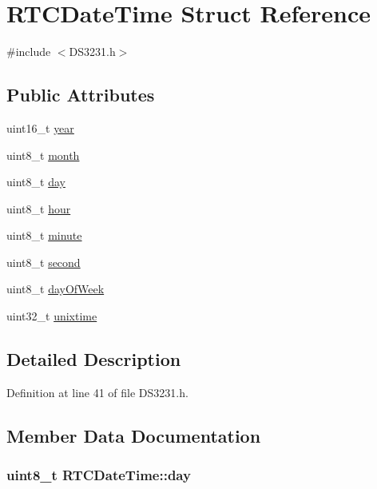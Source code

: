 \hypertarget{struct_r_t_c_date_time}{}\section{R\+T\+C\+Date\+Time Struct Reference}
\label{struct_r_t_c_date_time}


{\ttfamily \#include $<$D\+S3231.\+h$>$}

\subsection*{Public Attributes}
\begin{DoxyCompactItemize}
\item 
uint16\+\_\+t \hyperlink{struct_r_t_c_date_time_a265de5469447ed7581fec4d3c0c5814d}{year}
\item 
uint8\+\_\+t \hyperlink{struct_r_t_c_date_time_a434dc70ef64a1e99201f3765607e8afa}{month}
\item 
uint8\+\_\+t \hyperlink{struct_r_t_c_date_time_aea80bfd1209e6e459c70ea39bc248407}{day}
\item 
uint8\+\_\+t \hyperlink{struct_r_t_c_date_time_aaf23cb6337a6c0cb3bb69ad815f9c1b1}{hour}
\item 
uint8\+\_\+t \hyperlink{struct_r_t_c_date_time_a2e9c4e2b54185ec5bb7f328732bc1c63}{minute}
\item 
uint8\+\_\+t \hyperlink{struct_r_t_c_date_time_acf01c0fbd1d95fe33238674641f40027}{second}
\item 
uint8\+\_\+t \hyperlink{struct_r_t_c_date_time_a3fa952239e8a35b7ec390838ae1a6bd0}{day\+Of\+Week}
\item 
uint32\+\_\+t \hyperlink{struct_r_t_c_date_time_af46df69448c5456b54e9acae7629efa8}{unixtime}
\end{DoxyCompactItemize}


\subsection{Detailed Description}


Definition at line 41 of file D\+S3231.\+h.



\subsection{Member Data Documentation}
\subsubsection[{\texorpdfstring{day}{day}}]{\setlength{\rightskip}{0pt plus 5cm}uint8\+\_\+t R\+T\+C\+Date\+Time\+::day}\hypertarget{struct_r_t_c_date_time_aea80bfd1209e6e459c70ea39bc248407}{}\label{struct_r_t_c_date_time_aea80bfd1209e6e459c70ea39bc248407}


